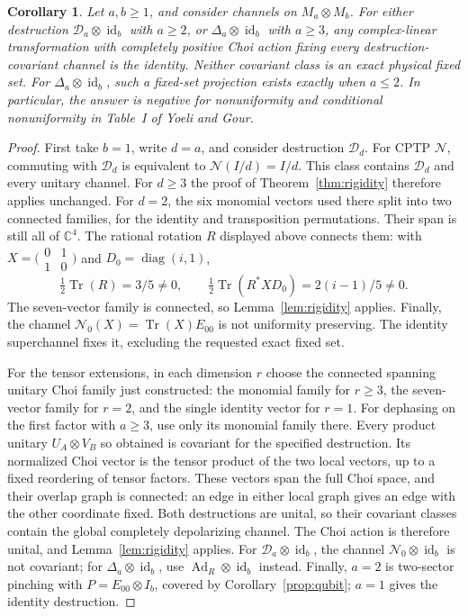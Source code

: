 \documentclass[11pt]{article}
\newtheorem{corollary}[theorem]{Corollary}
\newcommand{\Ad}{\operatorname{Ad}}
\newcommand{\Tr}{\operatorname{Tr}}
\newcommand{\id}{\operatorname{id}}
\begin{document}
\begin{corollary}\label{cor:uniform}
Let $a,b\geq1$, and consider channels on $M_a\otimes M_b$.
For either destruction $\mathcal D_a\otimes\id_b$ with $a\geq2$, or
$\Delta_a\otimes\id_b$ with $a\geq3$, any complex-linear transformation
with completely positive Choi action fixing every destruction-covariant
channel is the identity. Neither covariant class is an exact physical
fixed set. For $\Delta_a\otimes\id_b$, such a fixed-set projection exists
exactly when $a\leq2$.
In particular, the answer is negative for nonuniformity and conditional
nonuniformity in Table~I of Yoeli and Gour.
\end{corollary}
\begin{proof}
First take $b=1$, write $d=a$, and consider destruction $\mathcal D_d$.
For CPTP $\mathcal N$, commuting with $\mathcal D_d$ is equivalent to
$\mathcal N(I/d)=I/d$. This class contains $\mathcal D_d$ and every
unitary channel. For $d\geq3$ the proof of
Theorem~\ref{thm:rigidity} therefore applies unchanged.
For $d=2$, the six monomial vectors used there split into two connected
families, for the identity and transposition permutations. Their span is
still all of $\mathbb C^4$. The rational rotation $R$ displayed above
connects them: with $X=\bigl(\begin{smallmatrix}0&1\\1&0\end{smallmatrix}\bigr)$
and $D_0=\operatorname{diag}(i,1)$,
\[
 \tfrac12\Tr(R)=3/5\ne0,\qquad
 \tfrac12\Tr(R^*XD_0)=2(i-1)/5\ne0.
\]
The seven-vector family is connected, so Lemma~\ref{lem:rigidity} applies.
Finally, the channel $\mathcal N_0(X)=\Tr(X)E_{00}$ is not
uniformity preserving. The identity superchannel fixes it, excluding the
requested exact fixed set.

For the tensor extensions, in each dimension $r$ choose the connected
spanning unitary Choi family just constructed: the monomial family for
$r\geq3$, the seven-vector family for $r=2$, and the single identity
vector for $r=1$. For dephasing on the first factor with $a\geq3$, use
only its monomial family there. Every product unitary $U_A\otimes V_B$
so obtained is covariant for the specified destruction. Its normalized
Choi vector is the tensor product of the two local vectors, up to a fixed
reordering of tensor factors. These vectors span the full Choi space, and
their overlap graph is connected: an edge in either local graph gives an
edge with the other coordinate fixed. Both destructions are unital, so
their covariant classes contain the global completely depolarizing channel.
The Choi action is therefore unital, and Lemma~\ref{lem:rigidity} applies.
For $\mathcal D_a\otimes\id_b$, the channel
$\mathcal N_0\otimes\id_b$ is not covariant; for
$\Delta_a\otimes\id_b$, use $\Ad_R\otimes\id_b$ instead.
Finally, $a=2$ is two-sector pinching with $P=E_{00}\otimes I_b$,
covered by Corollary~\ref{prop:qubit}; $a=1$ gives the identity destruction.
\end{proof}
\end{document}
